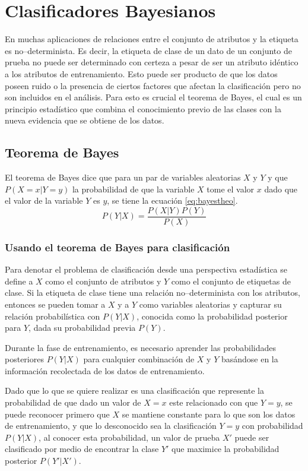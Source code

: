 \section{Clasificadores Bayesianos} \label{sec:bayes}
En muchas aplicaciones de relaciones entre el conjunto de atributos y la etiqueta es no--determinista. Es decir, la etiqueta de clase de un dato de un conjunto de prueba no puede ser determinado con certeza a pesar de ser un atributo idéntico a los atributos de entrenamiento. Esto puede ser producto de que los datos poseen ruido o la presencia de ciertos factores que afectan la clasificación pero no son incluidos en el análisis. Para esto es crucial el teorema de Bayes, el cual es un principio estadístico que combina el conocimiento previo de las clases con la nueva evidencia que se obtiene de los datos.

\subsection{Teorema de Bayes} \label{subsec:bayestheo}
El teorema de Bayes dice que para un par de variables aleatorias $X$ y $Y$ y que $P(X=x | Y=y)$ la probabilidad de que la variable $X$ tome el valor $x$ dado que el valor de la variable $Y$ es $y$, se tiene la ecuación \ref{eq:bayestheo}.
\begin{equation} \label{eq:bayestheo}
  P(Y | X) = \frac{P(X | Y) P(Y)}{P(X)}
\end{equation}

\subsubsection{Usando el teorema de Bayes para clasificación}
Para denotar el problema de clasificación desde una perspectiva estadística se define a $X$ como el conjunto de atributos y $Y$ como el conjunto de etiquetas de clase. Si la etiqueta de clase tiene una relación no--determinista con los atributos, entonces se pueden tomar a $X$ y a $Y$ como variables aleatorias y capturar su relación probabilística con $P(Y|X)$, conocida como la probabilidad posterior para $Y$, dada su probabilidad previa $P(Y)$.

Durante la fase de entrenamiento, es necesario aprender las probabilidades posteriores $P(Y|X)$ para cualquier combinación de $X$ y $Y$ basándose en la información recolectada de los datos de entrenamiento.

Dado que lo que se quiere realizar es una clasificación que represente la probabilidad de que dado un valor de $X=x$ este relacionado con que $Y=y$, se puede reconocer primero que $X$ se mantiene constante para lo que son los datos de entrenamiento, y que lo desconocido sea la clasificación $Y=y$ con probabilidad $P(Y|X)$, al conocer esta probabilidad, un valor de prueba $X'$ puede ser clasificado por medio de encontrar la clase $Y'$ que maximice la probabilidad posterior $P(Y'|X')$.


